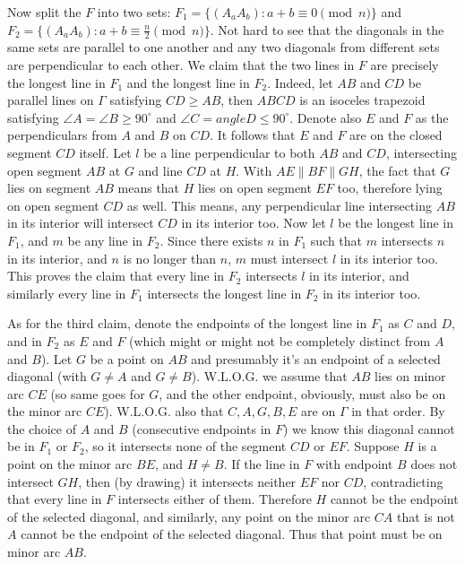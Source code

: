 \documentclass[11pt,a4paper]{article}
\begin{document}
\begin{itemize}
Now split the $F$ into two sets: $F_1=\{(A_aA_b): a+b\equiv 0\pmod{n}\}$ and $F_2=\{(A_aA_b): a+b\equiv \frac n2\pmod{n}\}$. 
Not hard to see that the diagonals in the same sets are parallel to one another and any two diagonals from different sets are perpendicular to each other. 
We claim that the two lines in $F$ are precisely the longest line in $F_1$ and the longest line in $F_2$. 
Indeed, let $AB$ and $CD$ be parallel lines on $\Gamma$ satisfying $CD\ge AB$, 
then $ABCD$ is an isoceles trapezoid satisfying $\angle A=\angle B\ge 90^{\circ}$ and $\angle C=angle D\le 90^{\circ}$. 
Denote also $E$ and $F$ as the perpendiculars from $A$ and $B$ on $CD$. It follows that $E$ and $F$ are on the closed segment $CD$ itself. 
Let $l$ be a line perpendicular to both $AB$ and $CD$, intersecting open segment $AB$ at $G$ and line $CD$ at $H$. 
With $AE\parallel BF\parallel GH$, the fact that $G$ lies on segment $AB$ means that $H$ lies on open segment $EF$ too, 
therefore lying on open segment $CD$ as well. 
This means, any perpendicular line intersecting $AB$ in its interior will intersect $CD$ in its interior too. 
Now let $l$ be the longest line in $F_1$, and $m$ be any line in $F_2$. Since there exists $n$ in $F_1$ such that $m$ intersects $n$ in its interior, and $n$ is no longer than $n$, $m$ must intersect $l$ in its interior too. This proves the claim that every line in $F_2$ intersects $l$ in its interior, and similarly every line in $F_1$ intersects the longest line in $F_2$ in its interior too. 

As for the third claim, 
denote the endpoints of the longest line in $F_1$ as $C$ and $D$, and in $F_2$ as $E$ and $F$ (which might or might not be completely distinct from $A$ and $B$). 
Let $G$ be a point on $AB$ and presumably it's an endpoint of a selected diagonal (with $G\neq A$ and $G\neq B$). 
W.L.O.G. we assume that $AB$ lies on minor arc $CE$ (so same goes for $G$, and the other endpoint, obviously, must also be on the minor arc $CE$). W.L.O.G. also that $C, A, G, B, E$ are on $\Gamma$ in that order.
By the choice of $A$ and $B$ (consecutive endpoints in $F$) we know this diagonal cannot be in $F_1$ or $F_2$, so it intersects 
none of the segment $CD$ or $EF$. 
Suppose $H$ is a point on the minor arc $BE$, and $H\neq B$. If the line in $F$ with endpoint $B$ does not intersect $GH$, 
then (by drawing) it intersects neither $EF$ nor $CD$, contradicting that every line in $F$ intersects either of them. 
Therefore $H$ cannot be the endpoint of the selected diagonal, and similarly, any point on the minor arc $CA$ that is not $A$ cannot be the endpoint of the selected diagonal. Thus that point must be on minor arc $AB$. 


\end{itemize}
\end{document}

